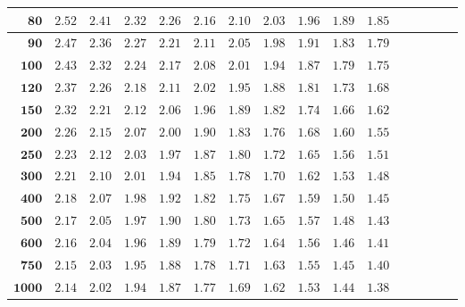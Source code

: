 \begin{customTableWrapper}{1.4}
\begin{longtable}{|r|r|r|r|r|r|r|r|r|r|r|r|r|r|r|r|}
    ${\mathbf{80}}$  & ${2.52}$    & ${2.41}$    & ${2.32}$    & ${2.26}$    & ${2.16}$    & ${2.10}$    & ${2.03}$    & ${1.96}$    & ${1.89}$    & ${1.85}$   \\ \hline 
    ${\mathbf{90}}$  & ${2.47}$    & ${2.36}$    & ${2.27}$    & ${2.21}$    & ${2.11}$    & ${2.05}$    & ${1.98}$    & ${1.91}$    & ${1.83}$    & ${1.79}$   \\ \hline 
    ${\mathbf{100}}$  & ${2.43}$    & ${2.32}$    & ${2.24}$    & ${2.17}$    & ${2.08}$    & ${2.01}$    & ${1.94}$    & ${1.87}$    & ${1.79}$    & ${1.75}$   \\ \hline 
    ${\mathbf{120}}$  & ${2.37}$    & ${2.26}$    & ${2.18}$    & ${2.11}$    & ${2.02}$    & ${1.95}$    & ${1.88}$    & ${1.81}$    & ${1.73}$    & ${1.68}$   \\ \hline 
    ${\mathbf{150}}$  & ${2.32}$    & ${2.21}$    & ${2.12}$    & ${2.06}$    & ${1.96}$    & ${1.89}$    & ${1.82}$    & ${1.74}$    & ${1.66}$    & ${1.62}$   \\ \hline 
    ${\mathbf{200}}$  & ${2.26}$    & ${2.15}$    & ${2.07}$    & ${2.00}$    & ${1.90}$    & ${1.83}$    & ${1.76}$    & ${1.68}$    & ${1.60}$    & ${1.55}$   \\ \hline 
    ${\mathbf{250}}$  & ${2.23}$    & ${2.12}$    & ${2.03}$    & ${1.97}$    & ${1.87}$    & ${1.80}$    & ${1.72}$    & ${1.65}$    & ${1.56}$    & ${1.51}$   \\ \hline 
    ${\mathbf{300}}$  & ${2.21}$    & ${2.10}$    & ${2.01}$    & ${1.94}$    & ${1.85}$    & ${1.78}$    & ${1.70}$    & ${1.62}$    & ${1.53}$    & ${1.48}$   \\ \hline 
    ${\mathbf{400}}$  & ${2.18}$    & ${2.07}$    & ${1.98}$    & ${1.92}$    & ${1.82}$    & ${1.75}$    & ${1.67}$    & ${1.59}$    & ${1.50}$    & ${1.45}$   \\ \hline 
    ${\mathbf{500}}$  & ${2.17}$    & ${2.05}$    & ${1.97}$    & ${1.90}$    & ${1.80}$    & ${1.73}$    & ${1.65}$    & ${1.57}$    & ${1.48}$    & ${1.43}$   \\ \hline 
    ${\mathbf{600}}$  & ${2.16}$    & ${2.04}$    & ${1.96}$    & ${1.89}$    & ${1.79}$    & ${1.72}$    & ${1.64}$    & ${1.56}$    & ${1.46}$    & ${1.41}$   \\ \hline 
    ${\mathbf{750}}$  & ${2.15}$    & ${2.03}$    & ${1.95}$    & ${1.88}$    & ${1.78}$    & ${1.71}$    & ${1.63}$    & ${1.55}$    & ${1.45}$    & ${1.40}$   \\ \hline 
    ${\mathbf{1000}}$  & ${2.14}$    & ${2.02}$    & ${1.94}$    & ${1.87}$    & ${1.77}$    & ${1.69}$    & ${1.62}$    & ${1.53}$    & ${1.44}$    & ${1.38}$   \\ \hline 
\end{longtable}
\end{customTableWrapper}
\changefontsizes{10pt}

\renewcommand{\arraystretch}{1}











